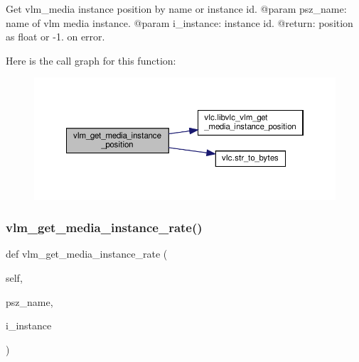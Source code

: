 \begin{DoxyVerb}Get vlm_media instance position by name or instance id.
@param psz_name: name of vlm media instance.
@param i_instance: instance id.
@return: position as float or -1. on error.
\end{DoxyVerb}
 Here is the call graph for this function\+:
\nopagebreak
\begin{figure}[H]
\begin{center}
\leavevmode
\includegraphics[width=350pt]{classvlc_1_1_instance_aaeb05c756ee13453ef1ddb527c4a3971_cgraph}
\end{center}
\end{figure}
\mbox{\label{classvlc_1_1_instance_aa77010aa624034fe43391cb0604f7d08}} 
\subsubsection{\texorpdfstring{vlm\+\_\+get\+\_\+media\+\_\+instance\+\_\+rate()}{vlm\_get\_media\_instance\_rate()}}
{\footnotesize\ttfamily def vlm\+\_\+get\+\_\+media\+\_\+instance\+\_\+rate (\begin{DoxyParamCaption}\item[{}]{self,  }\item[{}]{psz\+\_\+name,  }\item[{}]{i\+\_\+instance }\end{DoxyParamCaption})}

